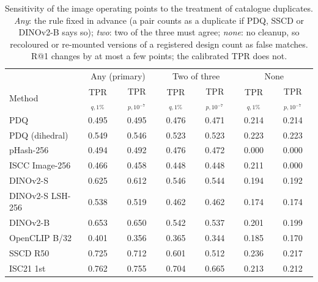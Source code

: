 \begin{table}[!t]
\centering
\footnotesize
\caption{Sensitivity of the image operating points to the treatment of catalogue duplicates. \emph{Any}: the rule fixed in advance (a pair counts as a duplicate if PDQ, SSCD or DINOv2-B says so); \emph{two}: two of the three must agree; \emph{none}: no cleanup, so recoloured or re-mounted versions of a registered design count as false matches. R@1 changes by at most a few points; the calibrated TPR does not.}
\label{tab:fp-sens}
\setlength{\tabcolsep}{3pt}
\begin{tabular}{lcccccc}
\toprule
 & \multicolumn{2}{c}{Any (primary)} & \multicolumn{2}{c}{Two of three} & \multicolumn{2}{c}{None} \\
Method & TPR$_{q,1\%}$ & TPR$_{p,10^{-7}}$ & TPR$_{q,1\%}$ & TPR$_{p,10^{-7}}$ & TPR$_{q,1\%}$ & TPR$_{p,10^{-7}}$ \\
\midrule
PDQ & 0.495 & 0.495 & 0.476 & 0.471 & 0.214 & 0.214 \\
PDQ (dihedral) & 0.549 & 0.546 & 0.523 & 0.523 & 0.223 & 0.223 \\
pHash-256 & 0.494 & 0.492 & 0.476 & 0.472 & 0.000 & 0.000 \\
ISCC Image-256 & 0.466 & 0.458 & 0.448 & 0.448 & 0.211 & 0.000 \\
DINOv2-S & 0.625 & 0.612 & 0.546 & 0.544 & 0.194 & 0.192 \\
DINOv2-S LSH-256 & 0.538 & 0.519 & 0.462 & 0.462 & 0.174 & 0.174 \\
DINOv2-B & 0.653 & 0.650 & 0.542 & 0.537 & 0.201 & 0.199 \\
OpenCLIP B/32 & 0.401 & 0.356 & 0.365 & 0.344 & 0.185 & 0.170 \\
SSCD R50 & 0.725 & 0.712 & 0.601 & 0.512 & 0.236 & 0.217 \\
ISC21 1st & 0.762 & 0.755 & 0.704 & 0.665 & 0.213 & 0.212 \\
\bottomrule
\end{tabular}

\end{table}
